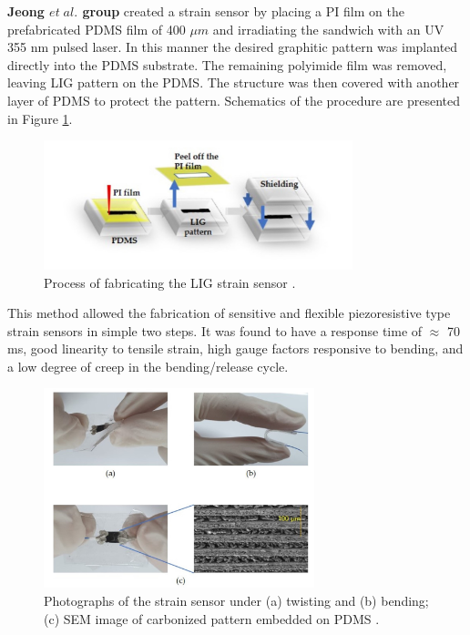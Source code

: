 \textbf{Jeong $et\; al.$ \cite{jeong_flexible_2019} group} created a strain sensor by placing a PI film on the prefabricated PDMS film of 400 $\mu m$ and irradiating the sandwich with an UV 355 nm pulsed laser. In this manner the desired graphitic pattern was implanted directly into the PDMS substrate. The remaining polyimide film was removed, leaving LIG pattern on the PDMS. The structure was then covered with another layer of PDMS to protect the pattern. Schematics of the procedure are presented in Figure \ref{fig:strain_jeong}. 


\begin{figure}[H]
\centering
\includegraphics[width=0.8\textwidth]{Figures/Theory/Jeong.jpg}
\medskip
\captionsetup{width=0.8\linewidth}
\caption{Process of fabricating the LIG strain sensor \cite{jeong_flexible_2019}.}
\label{fig:strain_jeong}
\end{figure}

This method allowed the fabrication of sensitive and flexible piezoresistive type strain sensors in simple two steps. It was found to have a response time of $\approx$ 70 ms, good linearity to tensile strain, high gauge factors responsive to bending, and a low degree of creep in the bending/release cycle. 


\begin{figure}[H]
\centering
\includegraphics[width=0.7\textwidth]{Figures/Theory/Jeong_2.jpg}
\medskip
\captionsetup{width=0.9\linewidth}
\caption{Photographs of the strain sensor under (a) twisting and (b) bending;  (c) SEM image of carbonized pattern embedded on PDMS \cite{jeong_flexible_2019}.}
\label{fig:strain_jeong_2}
\end{figure}


